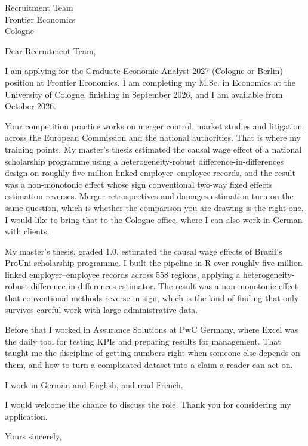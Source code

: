 \documentclass[a4paper,11pt]{letter}
\begin{document}
\begin{letter}{%
    Recruitment Team \\
    Frontier Economics \\
    Cologne
}

\opening{Dear Recruitment Team,}

I am applying for the Graduate Economic Analyst 2027 (Cologne or Berlin) position at Frontier Economics. I am completing my M.Sc. in Economics at the University of Cologne, finishing in September 2026, and I am available from October 2026.

%

Your competition practice works on merger control, market studies and litigation across the European Commission and the national authorities. That is where my training points. My master's thesis estimated the causal wage effect of a national scholarship programme using a heterogeneity-robust difference-in-differences design on roughly five million linked employer--employee records, and the result was a non-monotonic effect whose sign conventional two-way fixed effects estimation reverses. Merger retrospectives and damages estimation turn on the same question, which is whether the comparison you are drawing is the right one. I would like to bring that to the Cologne office, where I can also work in German with clients.

My master's thesis, graded 1.0, estimated the causal wage effects of Brazil's ProUni scholarship programme. I built the pipeline in R over roughly five million linked employer--employee records across 558 regions, applying a heterogeneity-robust difference-in-differences estimator. The result was a non-monotonic effect that conventional methods reverse in sign, which is the kind of finding that only survives careful work with large administrative data.

Before that I worked in Assurance Solutions at PwC Germany, where Excel was the daily tool for testing KPIs and preparing results for management. That taught me the discipline of getting numbers right when someone else depends on them, and how to turn a complicated dataset into a claim a reader can act on.

I work in German and English, and read French.

I would welcome the chance to discuss the role. Thank you for considering my application.

\closing{Yours sincerely,}

\end{letter}
\end{document}
